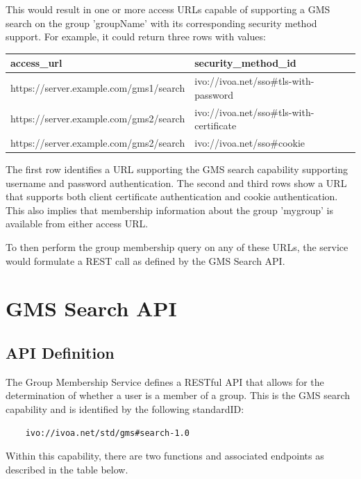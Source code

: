 \documentclass[11pt,a4paper]{ivoa}
\begin{document}
This would result in one or more access URLs capable of supporting a GMS search on the group 'groupName' with its corresponding security method support.  For example, it could return three rows with values:

\vspace{3mm}
\begin{tabular}{l l}
\textbf{access\_url} & \textbf{security\_method\_id} \\
\hline
https://server.example.com/gms1/search & ivo://ivoa.net/sso\#tls-with-password \\
https://server.example.com/gms2/search & ivo://ivoa.net/sso\#tls-with-certificate \\
https://server.example.com/gms2/search & ivo://ivoa.net/sso\#cookie \\
\hline
\end{tabular}
\vspace{3mm}

The first row identifies a URL supporting the GMS search capability supporting username and password authentication.  The second and third rows show a URL that supports both client certificate authentication and cookie authentication.  This also implies that membership information about the group 'mygroup' is available from either access URL.

To then perform the group membership query on any of these URLs, the service would formulate a REST call as defined by the GMS Search API.

\section{GMS Search API}

\subsection{API Definition}
\label{subsec:api}

The Group Membership Service defines a RESTful API \citep{fielding00} that allows for the determination of whether a user is a member of a group.  This is the GMS search capability and is identified by the following standardID:

\begin{verbatim}
    ivo://ivoa.net/std/gms#search-1.0
\end{verbatim}

Within this capability, there are two functions and associated endpoints as described in the table below.
\end{document}

